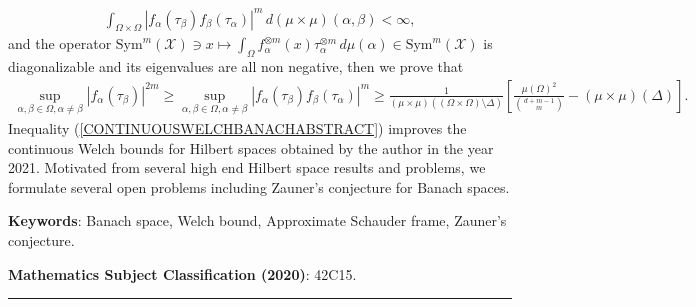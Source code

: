 \documentclass{amsart}
\begin{document}
\begin{align*}
	\int_{\Omega\times\Omega}|f_\alpha(\tau_\beta)f_\beta(\tau_\alpha)|^m\, d(\mu\times\mu)(\alpha,\beta)<\infty,
\end{align*} 
and the operator $	\text{Sym}^m(\mathcal{X})\ni x \mapsto  \int_{\Omega}f_\alpha^{\otimes m}(x)\tau_\alpha ^{\otimes m}\, d\mu (\alpha)\in\text{Sym}^m(\mathcal{X})$	 is diagonalizable and its eigenvalues are all non negative, then  we prove that  
\begin{align}\label{CONTINUOUSWELCHBANACHABSTRACT}
	\sup _{\alpha, \beta \in \Omega, \alpha\neq \beta}|f_\alpha(\tau_\beta) |^{2m}\geq 	\sup _{\alpha, \beta \in \Omega, \alpha\neq \beta}|f_\alpha(\tau_\beta)f_\beta(\tau_\alpha) |^{m}\geq \frac{1}{(\mu\times\mu)((\Omega\times\Omega)\setminus\Delta)}\left[\frac{	\mu(\Omega)^2}{{d+m-1 \choose m}}-(\mu\times\mu)(\Delta)\right].
\end{align}
Inequality (\ref{CONTINUOUSWELCHBANACHABSTRACT}) improves the continuous Welch bounds for Hilbert spaces obtained by the author in the year 2021. Motivated from several high end  Hilbert space results and problems, we formulate several open problems including Zauner's conjecture for Banach spaces.


\textbf{Keywords}:  Banach space, Welch bound, Approximate Schauder frame, Zauner's conjecture. 

\textbf{Mathematics Subject Classification (2020)}: 42C15.\\

\hrule


\tableofcontents
\end{document}
